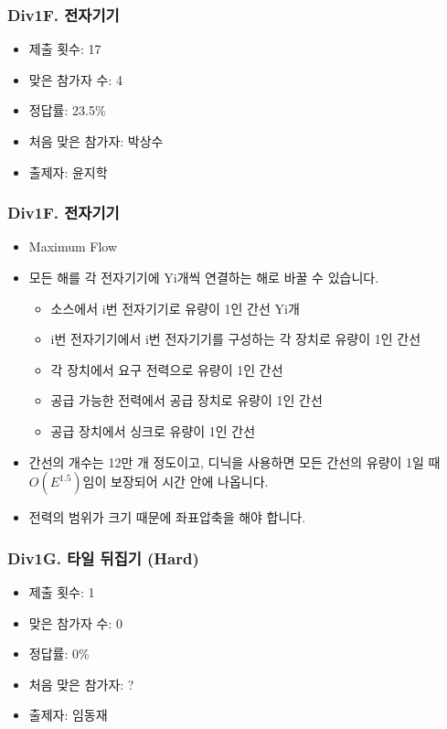 \documentclass[xetex]{beamer}
\begin{document}
\begin{frame}
  \frametitle{Div1F. 전자기기}
  \begin{itemize}
    \item 제출 횟수: 17
    \item 맞은 참가자 수: 4
    \item 정답률: 23.5\%
    \item 처음 맞은 참가자: 박상수
    \item 출제자: 윤지학
  \end{itemize}
\end{frame}

\begin{frame}
  \frametitle{Div1F. 전자기기}
  \begin{itemize}
    \item Maximum Flow
    \item 모든 해를 각 전자기기에 Yi개씩 연결하는 해로 바꿀 수 있습니다.
    \begin{itemize}
      \item 소스에서 i번 전자기기로 유량이 1인 간선 Yi개
      \item i번 전자기기에서 i번 전자기기를 구성하는 각 장치로 유량이 1인 간선
      \item 각 장치에서 요구 전력으로 유량이 1인 간선
      \item 공급 가능한 전력에서 공급 장치로 유량이 1인 간선
      \item 공급 장치에서 싱크로 유량이 1인 간선
    \end{itemize}
    \item 간선의 개수는 12만 개 정도이고, 디닉을 사용하면 모든 간선의 유량이 1일 때 $O(E^{1.5})$임이 보장되어 시간 안에 나옵니다.
    \item 전력의 범위가 크기 때문에 좌표압축을 해야 합니다.
  \end{itemize}
\end{frame}

\begin{frame}
  \frametitle{Div1G. 타일 뒤집기 (Hard)}
  \begin{itemize}
    \item 제출 횟수: 1
    \item 맞은 참가자 수: 0
    \item 정답률: 0\%
    \item 처음 맞은 참가자: ?
    \item 출제자: 임동재
  \end{itemize}
\end{frame}
\end{document}

